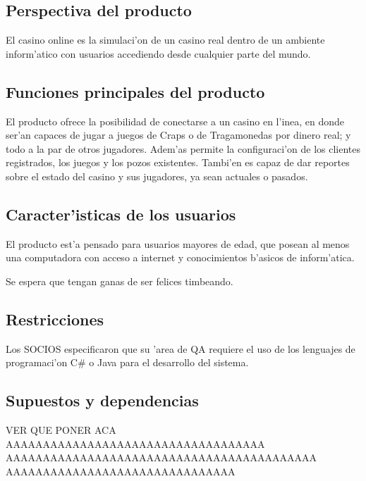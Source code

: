  \subsection{ Perspectiva del producto	}
El casino online es la simulaci'on de un casino real dentro de un ambiente inform'atico con usuarios accediendo desde cualquier parte del mundo.

 \subsection{ Funciones principales del producto }
El producto ofrece la posibilidad de conectarse a un casino en l'inea, en donde ser'an capaces de jugar a juegos de Craps o de Tragamonedas por dinero real; y todo a la par de otros jugadores. Adem'as permite la configuraci'on de los clientes registrados, los juegos y los pozos existentes. Tambi'en es capaz de dar reportes sobre el estado del casino y sus jugadores, ya sean actuales o pasados.

 \subsection{ Caracter'isticas de los usuarios }
El producto est'a pensado para usuarios mayores de edad, que posean al menos una computadora con acceso a internet y conocimientos b'asicos de inform'atica.

Se espera que tengan ganas de ser felices timbeando.

 \subsection{ Restricciones }
Los SOCIOS especificaron que su 'area de QA requiere el uso de los lenguajes de programaci'on C\# o Java para el desarrollo del sistema.

 \subsection{ Supuestos y dependencias	}

VER QUE PONER ACA AAAAAAAAAAAAAAAAAAAAAAAAAAAAAAAAAAA
AAAAAAAAAAAAAAAAAAAAAAAAAAAAAAAAAAAAAAAAAA
AAAAAAAAAAAAAAAAAAAAAAAAAAAAAAA

